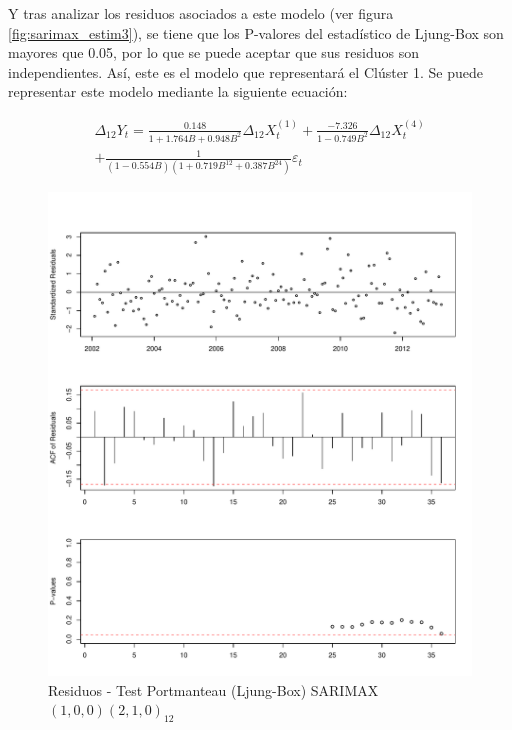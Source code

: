 \documentclass[12pt,oneside]{book}\usepackage[]{graphicx}\usepackage[]{color}
\makeatletter
\def\maxwidth{ %
  \ifdim\Gin@nat@width>\linewidth
    \linewidth
  \else
    \Gin@nat@width
  \fi
}
\newenvironment{knitrout}{}{} %
\theoremstyle{definition} %
\makeatother
\begin{document}
Y tras analizar los residuos asociados a este modelo (ver figura \ref{fig:sarimax_estim3}), se tiene que los P-valores del estadístico de Ljung-Box son mayores que 0.05, por lo que se puede aceptar que sus residuos son independientes. Así, este es el modelo que representará el Clúster 1. Se puede representar este modelo mediante la siguiente ecuación:


\begin{eqnarray} \label{eq:sarimax}
\Delta_{12} Y_t = \frac{0.148 }{1+ 1.764B + 0.948B^2} \Delta_{12} X^{(1)}_t + \frac{-7.326 }{1 - 0.749B^2} \Delta_{12} X^{(4)}_t     \nonumber\\
+ \frac{1}{( 1 - 0.554 B )(1+ 0.719 B^{12} +0.387 B^{24} )  }\varepsilon_t                  \label{prime}
\end{eqnarray}


\begin{knitrout}
\color{fgcolor}\begin{figure}[h]

{\centering \includegraphics[width=\maxwidth]{figure/unnamed-chunk-57-1} 

}

\caption{\label{fig:sarimax_estim3} Residuos - Test Portmanteau (Ljung-Box) SARIMAX $(1,0,0)(2,1,0)_{12}$}\label{fig:unnamed-chunk-57}
\end{figure}


\end{knitrout}
\end{document}
